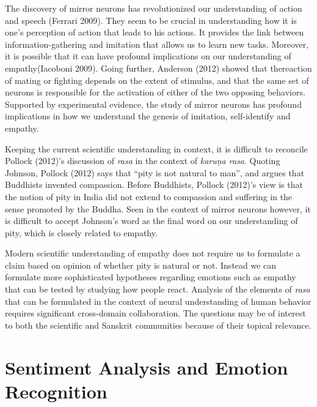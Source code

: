 The discovery of mirror neurons has revolutionized our understanding of action and speech (Ferrari 2009). They seem to be crucial in understanding how it is one's perception of action that leads to his actions. It provides the link between information-gathering and imitation that allows us to learn new tasks. Moreover, it is possible that it can have profound implications on our understanding of empathy\break (Iacoboni 2009). Going further, Anderson (2012) showed that the\break reaction of mating or fighting depends on the extent of stimulus, and that the same set of neurons is responsible for the activation of either of the two opposing behaviors. Supported by experimental evidence, the study of mirror neurons has profound implications in how we understand the genesis of imitation, self-identify and empathy. 

Keeping the current scientific understanding in context, it is difficult to reconcile Pollock (2012)’s discussion of \textsl{rasa} in the context of \textsl{karuṇa rasa}. Quoting Johnson, Pollock (2012) says that “pity is not natural to man”, and argues that Buddhists invented compassion. Before Buddhists, Pollock (2012)’s view is that the notion of pity in India did not extend to compassion and suffering in the sense promoted by the Buddha. Seen in the context of mirror neurons however, it is difficult to accept Johnson’s word as the final word on our understanding of pity, which is closely related to empathy.

Modern scientific understanding of empathy does not require us to formulate a claim based on opinion of whether pity is natural or not. Instead we can formulate more sophisticated hypotheses regarding emotions such as empathy that can be tested by studying how people react. Analysis of the elements of \textsl{rasa} that can be formulated in the context of neural understanding of human behavior requires significant cross-domain collaboration. The questions may be of interest to both the scientific and Sanskrit communities because of their topical relevance.\\[-22pt]

\section*{Sentiment Analysis and Emotion Recognition}


